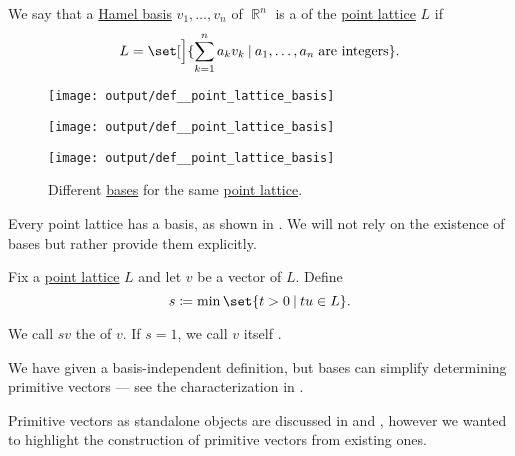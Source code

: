 \begin{definition}\label{def:point_lattice_basis}
  We say that a \hyperref[def:hamel_basis]{Hamel basis} \( v_1, \ldots, v_n \) of \( \BbbR^n \) is a  of the \hyperref[def:point_lattice]{point lattice} \( L \) if
  \begin{equation}\label{eq:def:point_lattice_basis}
    L = \set[\Big]{ \sum_{k=1}^n a_k v_k \given a_1, \ldots, a_n \T{are integers} }.
  \end{equation}

  \begin{figure}[!ht]
    \begin{subcaptionblock}{0.3\textwidth}
      \centering
      \texttt{[image: output/def\_\_point\_lattice\_basis]}
    \end{subcaptionblock}
    \hfill
    \begin{subcaptionblock}{0.3\textwidth}
      \centering
      \texttt{[image: output/def\_\_point\_lattice\_basis]}
    \end{subcaptionblock}
    \hfill
    \begin{subcaptionblock}{0.3\textwidth}
      \centering
      \texttt{[image: output/def\_\_point\_lattice\_basis]}
    \end{subcaptionblock}
    \caption{Different \hyperref[def:point_lattice_basis]{bases} for the same \hyperref[def:point_lattice]{point lattice}.}\label{fig:def:point_lattice_basis}
  \end{figure}
\end{definition}
\begin{comments}
  \item Every point lattice has a basis, as shown in \cite[thm. 21.2(ii)]{Gruber2007Geometry}. We will not rely on the existence of bases but rather provide them explicitly.
\end{comments}

\begin{definition}\label{def:primitive_lattice_vector}\mimprovised
  Fix a \hyperref[def:point_lattice]{point lattice} \( L \) and let \( v \) be a vector of \( L \). Define
  \begin{equation*}
    s \coloneqq \min\set{ t > 0 \given tu \in L }.
  \end{equation*}

  We call \( sv \) the  of \( v \). If \( s = 1 \), we call \( v \) itself .
\end{definition}
\begin{comments}
  \item We have given a basis-independent definition, but bases can simplify determining primitive vectors --- see the characterization in .
  \item Primitive vectors as standalone objects are discussed in  and , however we wanted to highlight the construction of primitive vectors from existing ones.
\end{comments}

